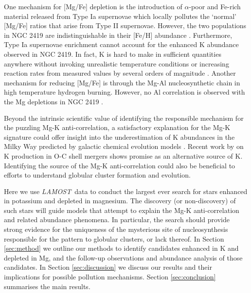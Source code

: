 \documentclass[a4paper,fleqn,usenatbib]{mnras}
\newcommand{\project}[1]{\emph{#1}}
\newcommand{\lamost}{\project{LAMOST}}
\begin{document}


One  mechanism for [Mg/Fe] depletion is the introduction of $\alpha$-poor and Fe-rich material released from Type Ia supernovae \citep{tsujimoto2012first} which locally pollutes the `normal' [Mg/Fe] ratios that arise from Type II supernovae. However, the two populations in NGC 2419 are indistinguishable in their [Fe/H] abundance \citep{cohenkirby2012}. Furthermore, Type Ia supernovae enrichment cannot account for the enhanced K abundance observed in NGC 2419. In fact, K is hard to make in sufficient quantities anywhere without invoking unrealistic temperature conditions or increasing reaction rates from measured values by several orders of magnitude \citep{ventura2012,iliadis2016}. Another mechanism for reducing [Mg/Fe] is through the Mg-Al nucleosynthetic chain in high temperature hydrogen burning. However, no Al correlation is observed with the Mg depletions in NGC 2419 \citep{cohenkirby2012,mucciarelli2012}.

Beyond the intrinsic scientific value of identifying the responsible mechanism for the puzzling Mg-K anti-correlation, a satisfactory explanation for the Mg-K signature could offer insight into the underestimation of K abundances in the Milky Way predicted by galactic chemical evolution models \citep{kobayashi2011}. Recent work by \cite{ritter2017} on K production in O-C shell mergers shows promise as an alternative source of K. Identifying the source of the Mg-K anti-correlation could also be beneficial to efforts to understand globular cluster formation and evolution.

Here we use \lamost\ data to conduct the largest ever search for stars enhanced in potassium and depleted in magnesium. The discovery (or non-discovery) of such stars will guide models that attempt to explain the Mg-K anti-correlation and related abundance phenomena. In particular, the search should provide strong evidence for the uniqueness of the mysterious site of nucleosynthesis responsible for the pattern to globular clusters, or lack thereof. In Section \ref{sec:method} we outline our methods to identify candidates enhanced in K and depleted in Mg, and the follow-up observations and abundance analysis of those candidates. In Section \ref{sec:discussion} we discuss our results and their implications for possible pollution mechanisms. Section \ref{sec:conclusion} summarises the main results.
\end{document}
